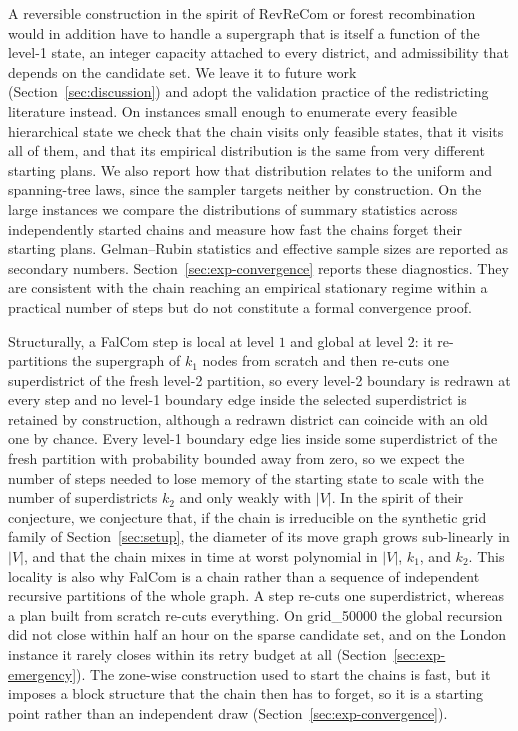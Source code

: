 \documentclass[preprint,12pt,authoryear]{elsarticle}
\theoremstyle{definition}
\begin{document}
A reversible construction in the spirit of RevReCom or forest recombination would in addition have to handle a supergraph that is itself a function of the level-1 state, an integer capacity attached to every district, and admissibility that depends on the candidate set. We leave it to future work (Section~\ref{sec:discussion}) and adopt the validation practice of the redistricting literature instead. On instances small enough to enumerate every feasible hierarchical state we check that the chain visits only feasible states, that it visits all of them, and that its empirical distribution is the same from very different starting plans. We also report how that distribution relates to the uniform and spanning-tree laws, since the sampler targets neither by construction. On the large instances we compare the distributions of summary statistics across independently started chains and measure how fast the chains forget their starting plans. Gelman--Rubin statistics and effective sample sizes are reported as secondary numbers. Section~\ref{sec:exp-convergence} reports these diagnostics. They are consistent with the chain reaching an empirical stationary regime within a practical number of steps but do not constitute a formal convergence proof.


Structurally, a FalCom step is local at level $1$ and global at level $2$: it re-partitions the supergraph of $k_1$ nodes from scratch and then re-cuts one superdistrict of the fresh level-2 partition, so every level-2 boundary is redrawn at every step and no level-1 boundary edge inside the selected superdistrict is retained by construction, although a redrawn district can coincide with an old one by chance. Every level-1 boundary edge lies inside some superdistrict of the fresh partition with probability bounded away from zero, so we expect the number of steps needed to lose memory of the starting state to scale with the number of superdistricts $k_2$ and only weakly with $|V|$. In the
spirit of their conjecture, we conjecture that, if the chain is irreducible on the synthetic grid family of Section~\ref{sec:setup}, the diameter of its move graph grows sub-linearly in $|V|$, and that the
chain mixes in time at worst polynomial in $|V|$, $k_1$, and $k_2$. This locality is also why FalCom is a chain rather than a sequence of independent recursive partitions of the whole graph. A step re-cuts one superdistrict, whereas a plan built from scratch re-cuts everything. On grid\_50000 the global recursion did not close within half an hour on the sparse candidate set, and on the London instance it rarely closes within its retry budget at all (Section~\ref{sec:exp-emergency}). The zone-wise construction used to start the chains is fast, but it imposes a block structure that the chain then has to forget, so it is a starting point rather than an independent draw (Section~\ref{sec:exp-convergence}). 
\end{document}
